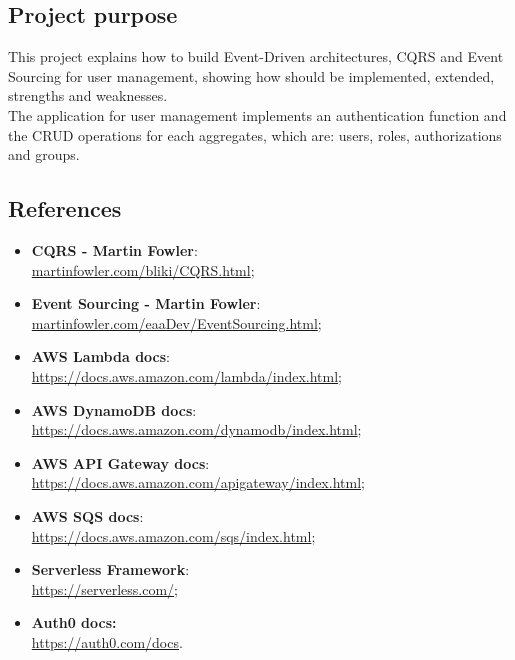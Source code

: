 \subsection{Project purpose}
This project explains how to build Event-Driven architectures, CQRS and Event Sourcing for user management, showing how should be implemented, extended, strengths and weaknesses.\\
The application for user management implements an authentication function and the CRUD operations for each aggregates, which are: users, roles, authorizations and groups.

\subsection{References}
\begin{itemize}
	\item \textbf{CQRS - Martin Fowler}:\\ \url{martinfowler.com/bliki/CQRS.html};
	\item \textbf{Event Sourcing - Martin Fowler}:\\ \url{martinfowler.com/eaaDev/EventSourcing.html};
	\item \textbf{AWS Lambda docs}:\\ \url{https://docs.aws.amazon.com/lambda/index.html};
	\item \textbf{AWS DynamoDB docs}:\\ \url{https://docs.aws.amazon.com/dynamodb/index.html};
	\item \textbf{AWS API Gateway docs}:\\ \url{https://docs.aws.amazon.com/apigateway/index.html};
	\item \textbf{AWS SQS docs}:\\ \url{https://docs.aws.amazon.com/sqs/index.html};
	\item \textbf{Serverless Framework}:\\ \url{https://serverless.com/};
	\item \textbf{Auth0 docs:} \\ \url{https://auth0.com/docs}.
	
\end{itemize}
\pagebreak
